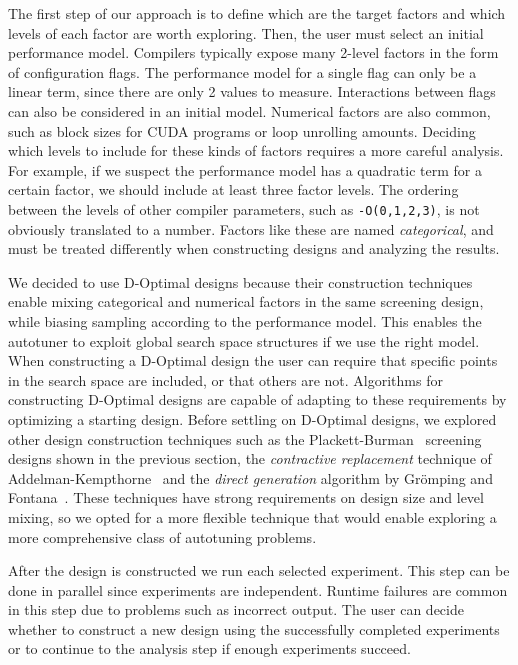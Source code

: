 \documentclass[conference]{IEEEtran}
\begin{document}
The first step of our approach is to define which are the target factors and
which levels of each factor are worth exploring. Then, the user must select an
initial performance model. Compilers typically expose many 2-level factors in
the form of configuration flags. The performance model for a single flag can
only be a linear term, since there are only 2 values to measure. Interactions
between flags can also be considered in an initial model. Numerical factors are
also common, such as block sizes for CUDA programs or loop unrolling amounts.
Deciding which levels to include for these kinds of factors requires a more
careful analysis. For example, if we suspect the performance model has a
quadratic term for a certain factor, we should include at least three factor
levels. The ordering between the levels of other compiler parameters, such as
\texttt{-O(0,1,2,3)}, is not obviously translated to a number. Factors like
these are named \emph{categorical}, and must be treated differently when constructing
designs and analyzing the results.

We decided to use D-Optimal designs because their construction techniques enable
mixing categorical and numerical factors in the same screening design, while
biasing sampling according to the performance model. This enables the autotuner to
exploit global search space structures if we use the right model. When
constructing a D-Optimal design the user can require that specific points in the
search space are included, or that others are not. Algorithms for constructing
D-Optimal designs are capable of adapting to these requirements by optimizing a
starting design. Before settling on D-Optimal designs, we explored other design
construction techniques such as the
Plackett-Burman~\cite{plackett1946design} screening designs shown in the
previous section, the \emph{contractive replacement} technique of
Addelman-Kempthorne~\cite{addelman1961some} and the \emph{direct generation}
algorithm by Grömping and Fontana~\cite{ulrike2018algorithm}. These
techniques have strong requirements on design size and level mixing, so we opted
for a more flexible technique that would enable exploring a more comprehensive
class of autotuning problems.

After the design is constructed we run each selected experiment. This step can
be done in parallel since experiments are independent. Runtime failures are
common in this step due to problems such as incorrect output. The user can
decide whether to construct a new design using the successfully completed
experiments or to continue to the analysis step if enough experiments succeed.
\end{document}
